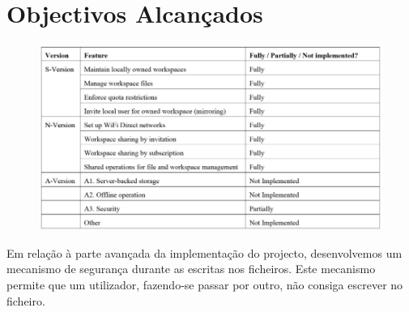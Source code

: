 \section{Objectivos Alcançados}

\begin{figure}[h!]
  \centering
    \includegraphics[width=1\textwidth]{images/table1.png}
\end{figure}

Em relação à parte avançada da implementação do projecto, desenvolvemos um mecanismo de segurança durante as escritas nos ficheiros. Este mecanismo permite que um utilizador, fazendo-se passar por outro, não consiga escrever no ficheiro.
